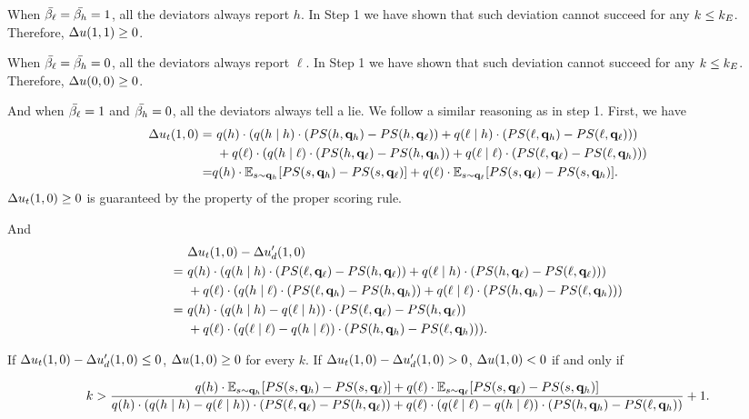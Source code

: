 When $\bar{\beta_{\ell}} = \bar{\beta_{h}} = 1$, all the deviators always report $h$. In Step 1 we have shown that such deviation cannot succeed for any $k \le k_E$. Therefore, $\Delta u(1, 1) \ge 0$. 

When $\bar{\beta_{\ell}} = \bar{\beta_{h}} = 0$, all the deviators always report $\ell$.  In Step 1 we have shown that such deviation cannot succeed for any $k \le k_E$. Therefore, $\Delta u(0, 0) \ge 0$. 

And when $\bar{\beta_{\ell}} = 1$ and $\bar{\beta_{h}} = 0$, all the deviators always tell a lie. We follow a similar reasoning as in step 1. 
First, we have 
\begin{align*}
    \Delta u_t (1, 0)
    =&\ q(h) \cdot (q(h\mid h) \cdot (PS(h, \mathbf{q}_h) - PS(h, \mathbf{q}_{\ell}))  + q(\ell \mid h) \cdot (PS(\ell, \mathbf{q}_h) - PS(\ell, \mathbf{q}_\ell)))\\
    &\ +  q(\ell)  \cdot (q(h\mid \ell) \cdot (PS(h, \mathbf{q}_\ell) - PS(h, \mathbf{q}_{h})) + q(\ell \mid \ell) \cdot (PS(\ell, \mathbf{q}_\ell) - PS(\ell, \mathbf{q}_h)))\\
    =& q(h)\cdot \mathbb{E}_{s\sim \mathbf{q}_{h}}[PS(s, \mathbf{q}_{h}) - PS(s, \mathbf{q}_{\ell})] + q(\ell) \cdot \mathbb{E}_{s\sim \mathbf{q}_{\ell}}[PS(s, \mathbf{q}_{\ell}) - PS(s, \mathbf{q}_{h})]. 
\end{align*}
$\Delta u_t(1, 0) \ge 0$ is guaranteed by the property of the proper scoring rule.

And 
\begin{align*}
    &\ \Delta u_t(1, 0) - \Delta u_d'(1, 0)\\
    =&\ q(h) \cdot (q(h\mid h) \cdot (PS(\ell, \mathbf{q}_\ell) - PS(h, \mathbf{q}_{\ell}))  + q(\ell \mid h) \cdot (PS(h, \mathbf{q}_\ell) - PS(\ell, \mathbf{q}_\ell)))\\
    &\ +  q(\ell)  \cdot (q(h\mid \ell) \cdot (PS(\ell, \mathbf{q}_h) - PS(h, \mathbf{q}_{h})) + q(\ell \mid \ell) \cdot (PS(h, \mathbf{q}_h) - PS(\ell, \mathbf{q}_h)))\\
    =&\ q(h)\cdot (q(h\mid h) - q(\ell \mid h)) \cdot (PS(\ell, \mathbf{q}_\ell) - PS(h, \mathbf{q}_{\ell}))\\
    &\ + q(\ell) \cdot (q(\ell\mid \ell) - q(h\mid \ell))\cdot (PS(h, \mathbf{q}_h) - PS(\ell, \mathbf{q}_h))).
\end{align*}

If $\Delta u_t(1, 0) - \Delta u_d'(1, 0) \le 0$, $\Delta u(1, 0)\ge 0$ for every $k$. If $\Delta u_t(1, 0) - \Delta u_d'(1, 0) > 0$, $\Delta u(1, 0) < 0$ if and only if 
\begin{smallblock}
\begin{equation*}
      k > \frac{q(h)\cdot \mathbb{E}_{s\sim \mathbf{q}_{h}}[PS(s, \mathbf{q}_{h}) - PS(s, \mathbf{q}_{\ell})] + q(\ell) \cdot \mathbb{E}_{s\sim \mathbf{q}_{\ell}}[PS(s, \mathbf{q}_{\ell}) - PS(s, \mathbf{q}_{h})]}{q(h)\cdot (q(h\mid h) - q(\ell \mid h)) \cdot (PS(\ell, \mathbf{q}_\ell) - PS(h, \mathbf{q}_{\ell})) +  q(\ell) \cdot (q(\ell\mid \ell) - q(h\mid \ell))\cdot (PS(h, \mathbf{q}_h) - PS(\ell, \mathbf{q}_h))} + 1.   
\end{equation*}

\end{smallblock}
    
